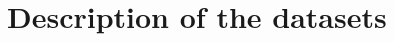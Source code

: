 \documentclass[natbib,smallextended]{svjour3}
\begin{document}
%
%




\appendix

\section{Description of the datasets}
\label{sec:appendix}
\end{document}
